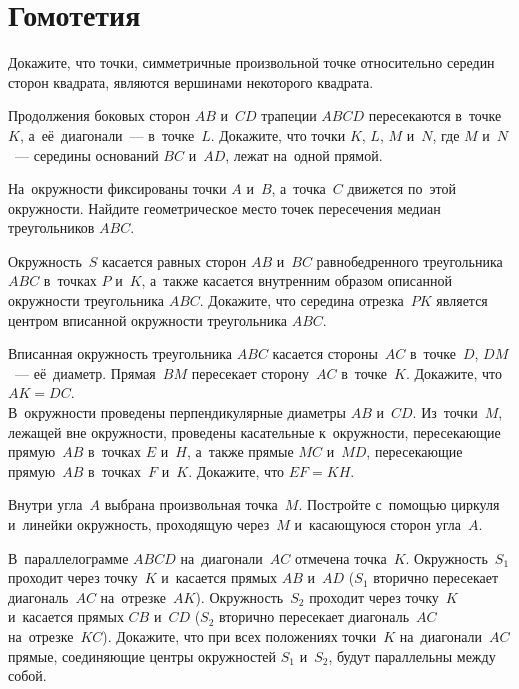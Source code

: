 
\section*{Гомотетия}


\begin{problems}

\item
Докажите, что точки, симметричные произвольной точке относительно середин
сторон квадрата, являются вершинами некоторого квадрата.

\item
Продолжения боковых сторон $AB$ и~$CD$ трапеции $ABCD$ пересекаются
в~точке~$K$, а~её~диагонали~--- в~точке~$L$.
Докажите, что точки $K$, $L$, $M$ и~$N$, где $M$ и~$N$~--- середины оснований
$BC$ и~$AD$, лежат на~одной прямой.

\item
На~окружности фиксированы точки $A$ и~$B$, а~точка~$C$ движется по~этой
окружности.
Найдите геометрическое место точек пересечения медиан треугольников $ABC$.

\item
Окружность~$S$ касается равных сторон $AB$ и~$BC$ равнобедренного
треугольника $ABC$ в~точках $P$ и~$K$, а~также касается внутренним образом
описанной окружности треугольника $ABC$.
Докажите, что середина отрезка~$PK$ является центром вписанной окружности
треугольника $ABC$.

\item
\sp
Вписанная окружность треугольника $ABC$ касается стороны~$AC$ в~точке~$D$,
$DM$~--- её~диаметр.
Прямая~$BM$ пересекает сторону~$AC$ в~точке~$K$.
Докажите, что $AK = DC$.
\\
\sp
В~окружности проведены перпендикулярные диаметры $AB$ и~$CD$.
Из~точки~$M$, лежащей вне окружности, проведены касательные к~окружности,
пересекающие прямую~$AB$ в~точках $E$ и~$H$, а~также прямые $MC$ и~$MD$,
пересекающие прямую~$AB$ в~точках~$F$ и~$K$.
Докажите, что $EF = KH$.

\item
Внутри угла~$A$ выбрана произвольная точка~$M$.
Постройте с~помощью циркуля и~линейки окружность, проходящую через~$M$
и~касающуюся сторон угла~$A$.

\item
В~параллелограмме $ABCD$ на~диагонали~$AC$ отмечена точка~$K$.
Окружность~$S_1$ проходит через точку~$K$ и~касается прямых $AB$ и~$AD$
($S_1$ вторично пересекает диагональ~$AC$ на~отрезке~$AK$).
Окружность~$S_2$ проходит через точку~$K$ и~касается прямых $CB$ и~$CD$
($S_2$ вторично пересекает диагональ~$AC$ на~отрезке~$KC$).
Докажите, что при всех положениях точки~$K$ на~диагонали~$AC$ прямые,
соединяющие центры окружностей $S_1$ и~$S_2$, будут параллельны между собой.

\end{problems}

